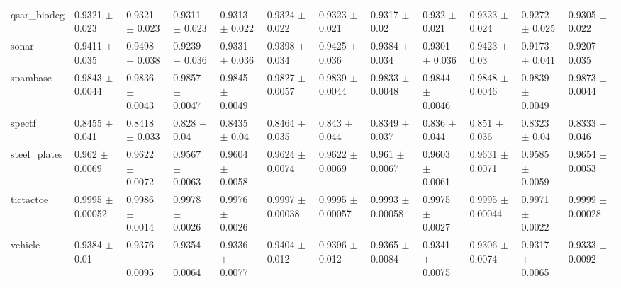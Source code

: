 \begin{tabular}{llllllllllll}
qsar\_biodeg & 0.9321 $\pm$ 0.023 & 0.9321 $\pm$ 0.023 & 0.9311 $\pm$ 0.023 & 0.9313 $\pm$ 0.022 & 0.9324 $\pm$ 0.022 & 0.9323 $\pm$ 0.021 & 0.9317 $\pm$ 0.02 & 0.932 $\pm$ 0.021 & 0.9323 $\pm$ 0.024 & 0.9272 $\pm$ 0.025 & 0.9305 $\pm$ 0.022 \\
sonar & 0.9411 $\pm$ 0.035 & 0.9498 $\pm$ 0.038 & 0.9239 $\pm$ 0.036 & 0.9331 $\pm$ 0.036 & 0.9398 $\pm$ 0.034 & 0.9425 $\pm$ 0.036 & 0.9384 $\pm$ 0.034 & 0.9301 $\pm$ 0.036 & 0.9423 $\pm$ 0.03 & 0.9173 $\pm$ 0.041 & 0.9207 $\pm$ 0.035 \\
spambase & 0.9843 $\pm$ 0.0044 & 0.9836 $\pm$ 0.0043 & 0.9857 $\pm$ 0.0047 & 0.9845 $\pm$ 0.0049 & 0.9827 $\pm$ 0.0057 & 0.9839 $\pm$ 0.0044 & 0.9833 $\pm$ 0.0048 & 0.9844 $\pm$ 0.0046 & 0.9848 $\pm$ 0.0046 & 0.9839 $\pm$ 0.0049 & 0.9873 $\pm$ 0.0044 \\
spectf & 0.8455 $\pm$ 0.041 & 0.8418 $\pm$ 0.033 & 0.828 $\pm$ 0.04 & 0.8435 $\pm$ 0.04 & 0.8464 $\pm$ 0.035 & 0.843 $\pm$ 0.044 & 0.8349 $\pm$ 0.037 & 0.836 $\pm$ 0.044 & 0.851 $\pm$ 0.036 & 0.8323 $\pm$ 0.04 & 0.8333 $\pm$ 0.046 \\
steel\_plates & 0.962 $\pm$ 0.0069 & 0.9622 $\pm$ 0.0072 & 0.9567 $\pm$ 0.0063 & 0.9604 $\pm$ 0.0058 & 0.9624 $\pm$ 0.0074 & 0.9622 $\pm$ 0.0069 & 0.961 $\pm$ 0.0067 & 0.9603 $\pm$ 0.0061 & 0.9631 $\pm$ 0.0071 & 0.9585 $\pm$ 0.0059 & 0.9654 $\pm$ 0.0053 \\
tictactoe & 0.9995 $\pm$ 0.00052 & 0.9986 $\pm$ 0.0014 & 0.9978 $\pm$ 0.0026 & 0.9976 $\pm$ 0.0026 & 0.9997 $\pm$ 0.00038 & 0.9995 $\pm$ 0.00057 & 0.9993 $\pm$ 0.00058 & 0.9975 $\pm$ 0.0027 & 0.9995 $\pm$ 0.00044 & 0.9971 $\pm$ 0.0022 & 0.9999 $\pm$ 0.00028 \\
vehicle & 0.9384 $\pm$ 0.01 & 0.9376 $\pm$ 0.0095 & 0.9354 $\pm$ 0.0064 & 0.9336 $\pm$ 0.0077 & 0.9404 $\pm$ 0.012 & 0.9396 $\pm$ 0.012 & 0.9365 $\pm$ 0.0084 & 0.9341 $\pm$ 0.0075 & 0.9306 $\pm$ 0.0074 & 0.9317 $\pm$ 0.0065 & 0.9333 $\pm$ 0.0092 \\
\bottomrule
\end{tabular}
